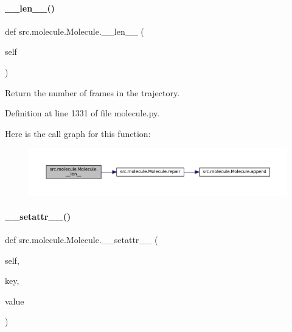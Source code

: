 \paragraph{\texorpdfstring{\+\_\+\+\_\+len\+\_\+\+\_\+()}{\_\_len\_\_()}}
{\footnotesize\ttfamily def src.\+molecule.\+Molecule.\+\_\+\+\_\+len\+\_\+\+\_\+ (\begin{DoxyParamCaption}\item[{}]{self }\end{DoxyParamCaption})}



Return the number of frames in the trajectory. 



Definition at line 1331 of file molecule.\+py.

Here is the call graph for this function\+:
\nopagebreak
\begin{figure}[H]
\begin{center}
\leavevmode
\includegraphics[width=350pt]{classsrc_1_1molecule_1_1Molecule_a23a3a5c340084abc00fb577d2b3c85c2_cgraph}
\end{center}
\end{figure}
\mbox{\label{classsrc_1_1molecule_1_1Molecule_a73f8860755f337e3fafb91d074a7d459}} 
\paragraph{\texorpdfstring{\+\_\+\+\_\+setattr\+\_\+\+\_\+()}{\_\_setattr\_\_()}}
{\footnotesize\ttfamily def src.\+molecule.\+Molecule.\+\_\+\+\_\+setattr\+\_\+\+\_\+ (\begin{DoxyParamCaption}\item[{}]{self,  }\item[{}]{key,  }\item[{}]{value }\end{DoxyParamCaption})}



